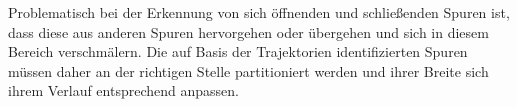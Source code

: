 Problematisch bei der Erkennung von sich öffnenden und schließenden Spuren ist, dass diese aus anderen
Spuren hervorgehen oder übergehen und sich in diesem Bereich verschmälern. Die auf Basis der Trajektorien
identifizierten Spuren müssen daher an der richtigen Stelle partitioniert werden und ihrer Breite
sich ihrem Verlauf entsprechend anpassen.